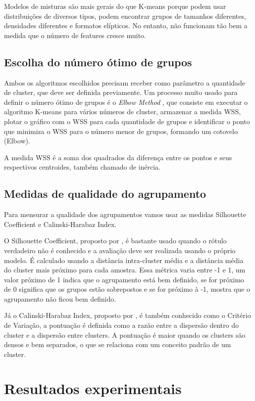 \documentclass{article}
\begin{document}
Modelos de misturas são mais gerais do que K-means porque podem usar distribuições de diversos tipos, podem encontrar grupos de tamanhos diferentes, densidades diferentes e formatos elípticos. No entanto, não funcionam tão bem a medida que o número de features cresce muito.

\subsection{Escolha do número ótimo de grupos}

Ambos os algoritmos escolhidos precisam receber como parâmetro a quantidade de cluster, que deve ser definida previamente. Um processo muito usado para definir o número ótimo de grupos é o \textit{Elbow Method }, que consiste em executar o algoritmo K-means para vários números de cluster, armazenar a medida WSS, plotar o gráfico com o WSS para cada quantidade de grupos e identificar o ponto que minimiza o WSS para o número menor de grupos, formando um cotovelo (Elbow). 

A medida WSS é a soma dos quadrados da diferença entre os pontos e seus respectivos centroides, também chamado de inércia.

\subsection{Medidas de qualidade do agrupamento}

Para mensurar a qualidade dos agrupamentos vamos usar as medidas Silhouette Coefficient e Calinski-Harabaz Index.

O Silhouette Coefficient, proposto por \cite{rousseeuw:1987} , é bastante usado quando o rótulo verdadeiro não é conhecido e a avaliação deve ser realizada usando o próprio modelo. É calculado usando a distância intra-cluster média e a distância média do cluster mais próximo para cada amostra.
Essa métrica varia entre -1 e 1, um valor próximo de 1 indica que o agrupamento está bem definido, se for próximo de 0 significa que os grupos estão sobrepostos e se for próximo à -1, mostra que o agrupamento não ficou bem definido.

Já o Calinski-Harabaz Index, proposto por \cite{calinski1974}, é também conhecido como o Critério de Variação, a pontuação é definida como a razão entre a dispersão dentro do cluster e a dispersão entre clusters. A pontuação é maior quando os clusters são densos e bem separados, o que se relaciona com um conceito padrão de um cluster.

\section{Resultados experimentais}
\end{document}
